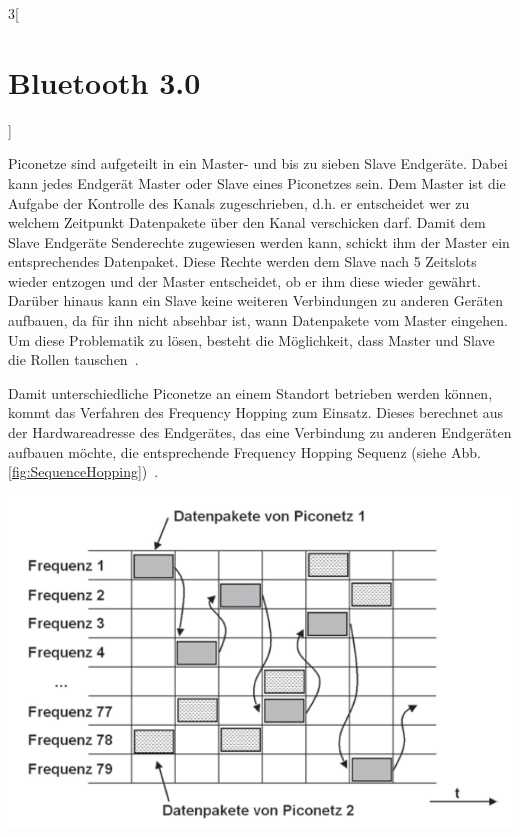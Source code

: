\begin{multicols}{3}[\section{Bluetooth 3.0}]
\begin{Figure}
\label{fig:Piconetze}
\end{Figure}

\noindent
Piconetze sind aufgeteilt in ein Master- und bis zu sieben Slave Endgeräte. Dabei kann jedes Endgerät Master oder Slave eines Piconetzes sein. Dem Master ist die Aufgabe der Kontrolle des Kanals zugeschrieben, d.h. er entscheidet wer zu welchem Zeitpunkt Datenpakete über den Kanal verschicken darf. Damit dem Slave Endgeräte Senderechte zugewiesen werden kann, schickt ihm der Master ein entsprechendes Datenpaket. Diese Rechte werden dem Slave nach 5 Zeitslots wieder entzogen und der Master entscheidet, ob er ihm diese wieder gewährt. Darüber hinaus kann ein Slave keine weiteren Verbindungen zu anderen Geräten aufbauen, da für ihn nicht absehbar ist, wann Datenpakete vom Master eingehen. Um diese Problematik zu lösen, besteht die Möglichkeit, dass Master und Slave die Rollen tauschen~\cite{bluetooth3.0.1}.

Damit unterschiedliche Piconetze an einem Standort betrieben werden können, kommt das Verfahren des Frequency Hopping zum Einsatz. Dieses berechnet aus der Hardwareadresse des Endgerätes, das eine Verbindung zu anderen Endgeräten aufbauen möchte, die entsprechende Frequency Hopping Sequenz (siehe Abb. \ref{fig:SequenceHopping})~\cite{bluetooth3.0.3}.

\begin{Figure}
\includegraphics[width=\linewidth]{Kapitel/Bluetooth3.0/Grafiken/frequencehopping.png}
\label{fig:SequenceHopping}
\end{Figure}


\end{multicols}
